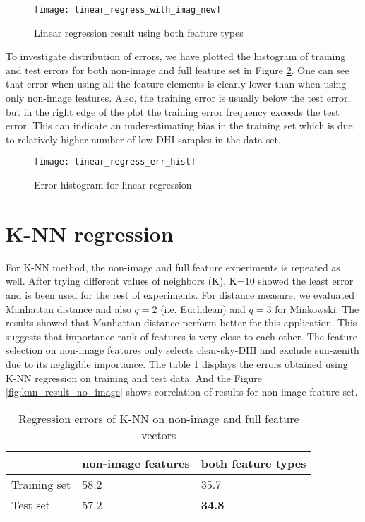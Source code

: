 \begin{figure}[h!]
\caption{Linear regression result using both feature types}
\label{fig:ln_result_all}
\texttt{[image: linear\_regress\_with\_imag\_new]}
\centering
\end{figure}

To investigate distribution of errors, we have plotted the histogram of training and test errors for both non-image and full feature set in Figure \ref{fig:ln_result_hist}. One can see that error when using all the feature elements is clearly lower than when using only non-image features. Also, the training error is usually below the test error, but in the right edge of the plot the training error frequency exceeds the test error. This can indicate an underestimating bias in the training set which is due to relatively higher number of low-DHI samples in the data set.

\begin{figure}[h!]
\caption{Error histogram for linear regression}
\label{fig:ln_result_hist}
\texttt{[image: linear\_regress\_err\_hist]}
\centering
\end{figure}

\section{K-NN regression}
For K-NN method, the non-image and full feature experiments is repeated as well. After trying different values of neighbors (K), K=10 showed the least error and is been used for the rest of experiments. For distance measure, we evaluated Manhattan distance and also $q=2$ (i.e. Euclidean) and $q=3$ for Minkowski. The results showed that Manhattan distance perform better for this application. This suggests that importance rank of features is very close to each other. The feature selection on non-image features only selects clear-sky-DHI and exclude sun-zenith due to its negligible importance. The table \ref{table:rmse_knn} displays the errors obtained using K-NN regression on training and test data. And the Figure \ref{fig:knn_result_no_image} shows correlation of results for non-image feature set.

\begin{table}[h!]
\centering
\begin{tabular}{ |p{2.5cm}||p{4cm}|p{4cm}|  }
\hline
 &non-image features& both feature types\\
 \hline
 Training set &   58.2  & 35.7 \\
 Test set&   57.2  & \textbf{34.8} \\
 \hline
\end{tabular}
\caption{Regression errors of K-NN on non-image and full feature vectors}
\label{table:rmse_knn}
\end{table}


